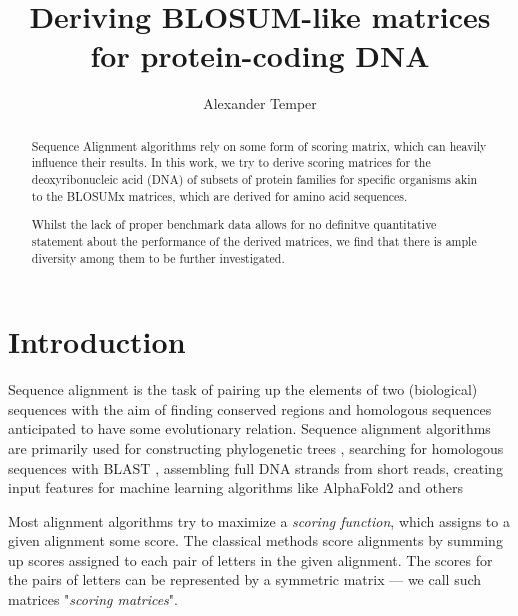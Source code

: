 \documentclass{article}
\title{Deriving BLOSUM-like matrices for protein-coding DNA}
\author{Alexander Temper}
\begin{document}
\maketitle

\begin{abstract}
    Sequence Alignment algorithms rely on some form of scoring matrix,
    which can heavily influence their results. In this work, we try to derive
    scoring matrices for the deoxyribonucleic acid (DNA) of subsets of protein
    families for specific organisms akin to
    the BLOSUMx matrices, which are derived for amino acid sequences.

    Whilst the lack of proper benchmark data allows for no definitve quantitative
    statement about the performance of the derived matrices, we find that there is ample diversity among them to be further investigated.
\end{abstract}



\section*{Introduction} Sequence alignment is the task of pairing up the
elements of two (biological) sequences with the aim of finding conserved
regions and homologous sequences anticipated to have some
evolutionary relation. Sequence alignment algorithms are primarily used for
constructing phylogenetic trees \cite{chatzouMultipleSequenceAlignment2016}, searching for homologous sequences with BLAST \cite{altschulBasicLocalAlignment1990},
assembling full DNA strands from short reads, creating input features for
machine learning algorithms like AlphaFold2 \cite{jumperHighlyAccurateProtein2021a} and others \cite{chatzouMultipleSequenceAlignment2016}

Most alignment algorithms try to maximize a \emph{scoring function},
which assigns to a given alignment some score. The classical methods score
alignments by summing up scores assigned to each pair of letters in the given
alignment. The scores for the pairs of letters can be represented by a
symmetric matrix --- we call such matrices "\emph{scoring matrices}".
\end{document}
